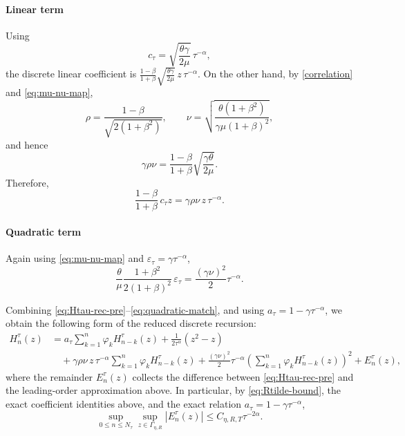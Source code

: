 \documentclass[letterpaper]{article}
\numberwithin{equation}{section}
\theoremstyle{definition}
\theoremstyle{remark}
\begin{document}
\paragraph{Linear term}
Using
\[
  c_\tau=\sqrt{\frac{\theta\gamma}{2\mu}}\,\tau^{-\alpha},
\]
the discrete linear coefficient is
$\frac{1-\beta}{1+\beta}\sqrt{\frac{\theta\gamma}{2\mu}}\,z\,\tau^{-\alpha}$.
On the other hand, by \eqref{correlation} and \eqref{eq:mu-nu-map},
\[
  \rho=\frac{1-\beta}{\sqrt{2(1+\beta^2)}},
  \qquad
  \nu=\sqrt{\frac{\theta(1+\beta^2)}{\gamma\mu(1+\beta)^2}},
\]
and hence
\begin{equation}\label{eq:rho-nu-id}
  \gamma\rho\nu
  =
  \frac{1-\beta}{1+\beta}\sqrt{\frac{\gamma\theta}{2\mu}}.
\end{equation}
Therefore,
\begin{equation}\label{eq:linear-match}
  \frac{1-\beta}{1+\beta}\,c_\tau z
  =
  \gamma\rho\nu\,z\,\tau^{-\alpha}.
\end{equation}

\paragraph{Quadratic term}
Again using \eqref{eq:mu-nu-map} and $\varepsilon_\tau=\gamma\tau^{-\alpha}$,
\begin{equation}\label{eq:quadratic-match}
  \frac{\theta}{\mu}\frac{1+\beta^2}{2(1+\beta)^2}\,\varepsilon_\tau
  =
  \frac{(\gamma\nu)^2}{2}\tau^{-\alpha}.
\end{equation}

Combining \eqref{eq:Htau-rec-pre}--\eqref{eq:quadratic-match}, and using
$a_\tau=1-\gamma\tau^{-\alpha}$, we obtain the following form of the
reduced discrete recursion:
\begin{equation}\label{eq:Htau-rec-main}
\begin{aligned}
  H_n^\tau(z)
  &= a_\tau\sum_{k=1}^n \varphi_k H_{n-k}^\tau(z)
     +\frac{1}{2\tau^\alpha}(z^2-z)
\\
  &\quad
     +\gamma\rho\nu\,z\,\tau^{-\alpha}
      \sum_{k=1}^n \varphi_k H_{n-k}^\tau(z)
     +\frac{(\gamma\nu)^2}{2}\tau^{-\alpha}
      \left(\sum_{k=1}^n \varphi_k H_{n-k}^\tau(z)\right)^2
     +E_n^\tau(z),
\end{aligned}
\end{equation}
where the remainder $E_n^\tau(z)$ collects the difference between
\eqref{eq:Htau-rec-pre} and the leading-order approximation above. In particular, by \eqref{eq:Rtilde-bound}, the exact coefficient identities above, and the exact relation $a_\tau=1-\gamma\tau^{-\alpha}$,
\begin{equation}\label{eq:En-bound}
  \sup_{0\le n\le N_\tau}\sup_{z\in\Gamma_{\eta,R}}
  |E_n^\tau(z)|
  \le C_{\eta,R,T}\tau^{-2\alpha}.
\end{equation}
\end{document}
